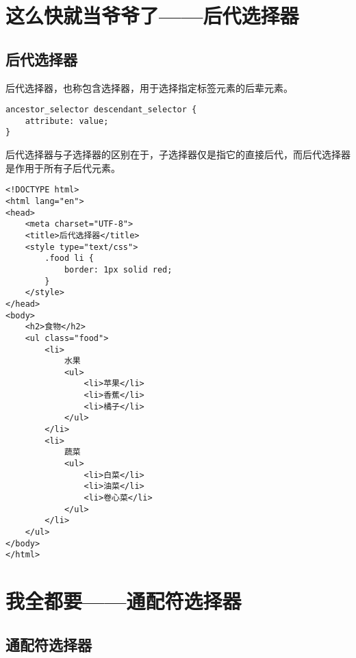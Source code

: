 \newpage

\section{这么快就当爷爷了——后代选择器}

\subsection{后代选择器}

后代选择器，也称包含选择器，用于选择指定标签元素的后辈元素。 \\

\begin{lstlisting}[style=htmlcssjs]
ancestor_selector descendant_selector {
    attribute: value;
}
\end{lstlisting}

后代选择器与子选择器的区别在于，子选择器仅是指它的直接后代，而后代选择器是作用于所有子后代元素。

\begin{lstlisting}[style=htmlcssjs, title=后代选择器]
<!DOCTYPE html>
<html lang="en">
<head>
    <meta charset="UTF-8">
    <title>后代选择器</title>
    <style type="text/css">
        .food li {
            border: 1px solid red;
        }
    </style>
</head>
<body>
    <h2>食物</h2>
    <ul class="food">
        <li>
            水果
            <ul>
                <li>苹果</li>
                <li>香蕉</li>
                <li>橘子</li>
            </ul>
        </li>
        <li>
            蔬菜
            <ul>
                <li>白菜</li>
                <li>油菜</li>
                <li>卷心菜</li>
            </ul>
        </li>
    </ul>
</body>
</html>
\end{lstlisting}

\newpage

\section{我全都要——通配符选择器}

\subsection{通配符选择器}

